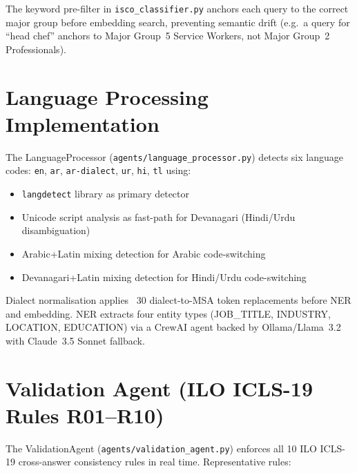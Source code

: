 The keyword pre-filter in \texttt{isco\_classifier.py} anchors each query to
the correct major group before embedding search, preventing semantic drift
(e.g.\ a query for ``head chef'' anchors to Major Group~5 Service Workers, not
Major Group~2 Professionals).

\section{Language Processing Implementation}
\label{sec:impl-lang}

The LanguageProcessor (\texttt{agents/\-language\_\-processor.\-py}) detects six
language codes: \texttt{en}, \texttt{ar}, \texttt{ar-dialect}, \texttt{ur},
\texttt{hi}, \texttt{tl} using:
\begin{itemize}
  \item \texttt{langdetect} library as primary detector
  \item Unicode script analysis as fast-path for Devanagari (Hindi/Urdu disambiguation)
  \item Arabic+Latin mixing detection for Arabic code-switching
  \item Devanagari+Latin mixing detection for Hindi/Urdu code-switching
\end{itemize}

Dialect normalisation applies ~30 dialect-to-MSA token replacements
before NER and embedding.
NER extracts four entity types (JOB\_TITLE, INDUSTRY, LOCATION, EDUCATION)
via a CrewAI agent backed by Ollama/Llama~3.2 with Claude~3.5 Sonnet
fallback.

\section{Validation Agent (ILO ICLS-19 Rules R01--R10)}
\label{sec:impl-validation}

The ValidationAgent (\texttt{agents/\-validation\_\-agent.\-py}) enforces all 10
ILO ICLS-19 cross-answer consistency rules in real time.
Representative rules:

